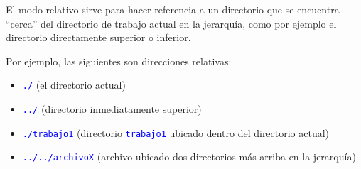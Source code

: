 \documentclass[12pt]{article}
\newcommand{\cw}[1]{\texttt{\textcolor{blue}{#1}}}
\begin{document}
El modo relativo sirve para hacer referencia a un directorio que se encuentra
``cerca'' del directorio de trabajo actual en la jerarquía, como por ejemplo
el directorio directamente superior o inferior.

Por ejemplo, las siguientes son direcciones relativas:

\vspace{-2\topsep}
\begin{itemize}

    \itemsep2pt \parskip0pt 

    \item \cw{./} (el directorio actual)

    \item \cw{../} (directorio inmediatamente superior)

    \item \cw{./trabajo1} (directorio \cw{trabajo1} ubicado dentro del
        directorio actual)

    \item \cw{../../archivoX} (archivo ubicado dos directorios más arriba en
        la jerarquía)

\end{itemize}
\end{document}

